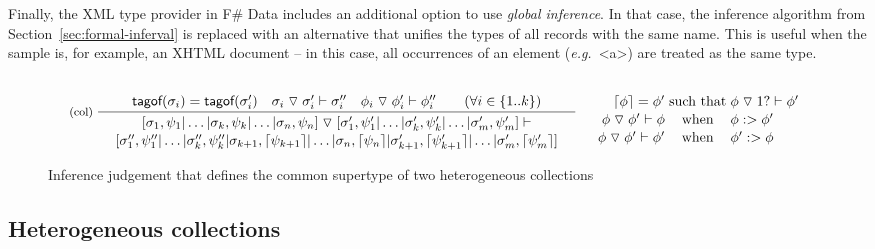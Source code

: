 \documentclass[10pt,preprint,clearpagebib]{sigplanconf}
\newcommand{\ident}[1]{\textnormal{\sffamily #1}}
\newcommand{\narrow}[1]{\hspace{-0.7em} #1 \hspace{-0.7em}}
\newcommand{\tsep}[0]{\; \triangledown \;}
\newcommand{\addopt}[1]{\lceil#1\rceil}
\newcommand{\tytagof}{\ident{tagof}}
\begin{document}
Finally, the XML type provider in F\# Data includes an additional option to use \emph{global inference}.
In that case, the inference algorithm from Section~\ref{sec:formal-inferval} is replaced with an alternative
that unifies the types of all records with the same name. This is useful when the sample is, for example,
an XHTML document -- in this case, all occurrences of an element (\emph{e.g.}~{\small\ttfamily <a>})
are treated as the same type.


\begin{figure}
\noindent
\begin{equation*}
\inference[(col)\;]
  { \tytagof(\sigma_i) = \tytagof(\sigma'_i) \quad 
    \sigma_i \tsep \sigma'_i \vdash \sigma''_i \quad
    \phi_i \tsep \phi'_i \vdash \phi''_i \qquad (\forall i\in \{ 1 .. k \}) }
  { \begin{array}{c}
    [\sigma_1,\psi_1 | \ldots | \sigma_k,\psi_k | \ldots | \sigma_n,\psi_n ] \tsep 
    [\sigma'_1,\psi'_1 | \ldots | \sigma'_k, \psi'_k | \ldots | \sigma'_m, \psi'_m ] \vdash\\[0.1em]
    [\sigma''_1, \psi''_1 | \ldots | \sigma''_k, \psi''_k | 
        \sigma_{k+1},\addopt{\psi_{k+1}} | \ldots | \sigma_{n},\addopt{\psi_{n}} |
        \sigma'_{k+1},\addopt{\psi'_{k+1}} | \ldots | \sigma'_{m}, \addopt{\psi'_{m}} ]
    \end{array} }
\quad
\begin{array}{rcl}
 \\
 \addopt{\phi} = \phi'&\narrow{\textnormal{such that}}&\phi \tsep 1? \vdash \phi' \\[0.1em]
 \phi \tsep \phi' \vdash \phi&\narrow{\textnormal{when}}&\phi :> \phi' \\[0.1em]
 \phi \tsep \phi' \vdash \phi'&\narrow{\textnormal{when}}&\phi' :> \phi
\end{array}    
\end{equation*}
\caption{Inference judgement that defines the common supertype of two heterogeneous collections}
\label{fig:subtyping-hetcol}
\end{figure}


\subsection{Heterogeneous collections}
\label{sec:impl-collections}
\end{document}
